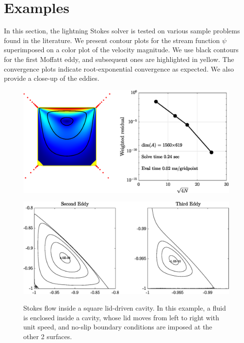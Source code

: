 
\section{Examples \label{sec:results}}
In this section, the lightning Stokes solver is tested on various sample problems found in the literature. We present contour plots for the stream function $\psi$ superimposed on a color plot of the velocity magnitude. We use black contours for the first Moffatt eddy, and subsequent ones are highlighted in yellow. The convergence plots indicate root-exponential convergence as expected. We also provide a close-up of the eddies.

\begin{figure}[H]
	\centering
	\includegraphics[width=\linewidth]{Figures/ldc}
	
	\vspace{2em}
	\includegraphics[width=\linewidth]{Figures/ldc_eddy}
	\label{fig:ldc}
	\caption{Stokes flow inside a square lid-driven cavity. In this example, a fluid is enclosed inside a cavity, whose lid moves from left to right with unit speed, and no-slip boundary conditions are imposed at the other 2 surfaces.}
\end{figure} 

